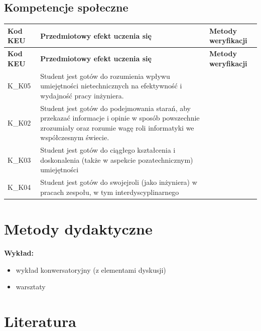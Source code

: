 \documentclass[12pt, a4paper]{article}
\newcommand{\thdrule}{\noalign{\global\setlength{\extrarowheight}{0pt}}}
\newcommand{\thdend}{\noalign{\global\setlength{\extrarowheight}{3pt}}}
\begin{document}
\subsection*{Kompetencje społeczne}
{\scriptsize
\begin{longtable}{m{1.6cm}m{9.0cm}m{4.2cm}}
\thdrule\toprule
\rowcolor{pjatkRed} {\color{white}\footnotesize\textbf{\vphantom{Ag}Kod KEU}} & {\color{white}\footnotesize\textbf{\vphantom{Ag}Przedmiotowy efekt uczenia się}} & {\color{white}\footnotesize\textbf{\vphantom{Ag}Metody weryfikacji}} \\
\midrule\thdend
\endfirsthead
\thdrule\toprule
\rowcolor{pjatkRed} {\color{white}\footnotesize\textbf{\vphantom{Ag}Kod KEU}} & {\color{white}\footnotesize\textbf{\vphantom{Ag}Przedmiotowy efekt uczenia się}} & {\color{white}\footnotesize\textbf{\vphantom{Ag}Metody weryfikacji}} \\
\midrule\thdend
\endhead
  \rowcolor{tableRowLight} K\_K05 & Student jest gotów do rozumienia wpływu umiejętności nietechnicznych na efektywność i wydajność pracy inżyniera. &  \\
  \rowcolor{tableRowAlt} K\_K02 & Student jest gotów do   podejmowania starań, aby przekazać informacje i opinie w sposób powszechnie zrozumiały oraz rozumie  wagę roli informatyki we współczesnym świecie. &  \\
  \rowcolor{tableRowLight} K\_K03 & Student jest gotów do ciągłego kształcenia i doskonalenia (także w aspekcie pozatechnicznym) umiejętności &  \\
  \rowcolor{tableRowAlt} K\_K04 & Student jest gotów do swojejroli (jako inżyniera) w pracach zespołu, w tym interdyscyplinarnego &  \\
\bottomrule
\end{longtable}}

\section{Metody dydaktyczne}

\textbf{Wykład:}
\begin{itemize}
  \item wykład konwersatoryjny (z elementami dyskusji)
  \item warsztaty
\end{itemize}
\vspace{4pt}


\section{Literatura}
\end{document}
